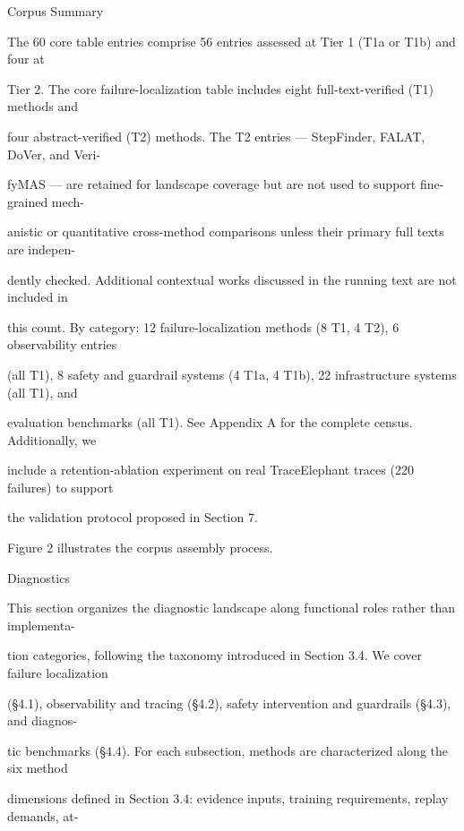 \begin{flushleft}
\par\smallskip
{} Corpus Summary\par
\noindent The 60 core table entries comprise 56 entries assessed at Tier 1 (T1a or T1b) and four at\par
\noindent Tier 2. The core failure-localization table includes eight full-text-verified (T1) methods and\par
\noindent four abstract-verified (T2) methods. The T2 entries — StepFinder, FALAT, DoVer, and Veri-\par
\noindent fyMAS — are retained for landscape coverage but are not used to support fine-grained mech-\par
\noindent anistic or quantitative cross-method comparisons unless their primary full texts are indepen-\par
\noindent dently checked. Additional contextual works discussed in the running text are not included in\par
\noindent this count. By category: 12 failure-localization methods (8 T1, 4 T2), 6 observability entries\par
\noindent (all T1), 8 safety and guardrail systems (4 T1a, 4 T1b), 22 infrastructure systems (all T1), and\par
{} evaluation benchmarks (all T1). See Appendix A for the complete census. Additionally, we\par
\noindent include a retention-ablation experiment on real TraceElephant traces (220 failures) to support\par
\noindent the validation protocol proposed in Section 7.\par
\noindent  Figure 2 illustrates the corpus assembly process.\par
\par\smallskip
\par\smallskip
{} Diagnostics\par
\noindent This section organizes the diagnostic landscape along functional roles rather than implementa-\par
\noindent tion categories, following the taxonomy introduced in Section 3.4. We cover failure localization\par
\noindent (§4.1), observability and tracing (§4.2), safety intervention and guardrails (§4.3), and diagnos-\par
\noindent tic benchmarks (§4.4). For each subsection, methods are characterized along the six method\par
\noindent dimensions defined in Section 3.4: evidence inputs, training requirements, replay demands, at-\par

\end{flushleft}
